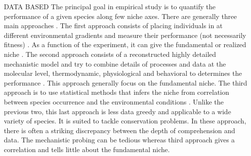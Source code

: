 DATA BASED
The principal goal in empirical study is to quantify the performance of a given species along few niche axes.
There are generally three main approaches \citep{Holt2009}.
The first approach consists of placing individuals in at different environmental gradients and measure their performance (not necessarily fitness) \citep{Birch1953, Elliott1982, Angert2005, Frazier2006}.
As a function of the experiment, it can give the fundamental or realized niche \citep{Birch1953, Elliott1982, Angert2005, Frazier2006}.
The second approach consists of a reconstructed highly detailed mechanistic model and try to combine details of processes and data at the molecular level, thermodynamic, physiological and behavioral to determines the performance \citep{Kooijman2009, Kearney2009, Buckley2008}.
This approach generally focus on the fundamental niche.
The third approach is to use statistical methods that infers the niche from correlation between species occurrence and the environmental conditions \citep{Guisan2005, Austin2007, Elith2009}. %
Unlike the previous two, this last approach is less data greedy and applicable to a wide variety of species.
It is suited to tackle conservation problems.
In these approach, there is often a striking discrepancy between the depth of comprehension and data.
The mechanistic probing can be tedious whereas third approach gives a correlation and tells little about the fundamental niche.

